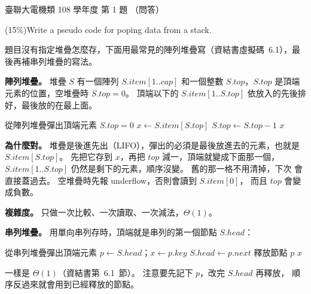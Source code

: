 \begin{pastexam}[label={px:ust-108-ee-ds-01}]{臺聯大電機類 108 學年度 第 1 題}
（問答）

(15\%)Write a pseudo code for poping data from a stack.
\end{pastexam}

\begin{pastsoln}
題目沒有指定堆疊怎麼存，下面用最常見的陣列堆疊寫（資結書虛擬碼~6.1），最後再補串列堆疊的寫法。

\textbf{陣列堆疊。} 堆疊 $S$ 有一個陣列 $S.\mathit{item}[1..\mathit{cap}]$ 和一個整數
$S.\mathit{top}$，$S.\mathit{top}$ 是頂端元素的位置，空堆疊時 $S.\mathit{top} = 0$。 頂端以下的
$S.\mathit{item}[1..S.\mathit{top}]$ 依放入的先後排好，最後放的在最上面。

\begin{pseudo}[unbreakable]{從陣列堆疊彈出頂端元素}
    \State \Return $S.\mathit{top} = 0$
\EndFunction
\Statex
{}
        \State {} 
    \EndIf
    \State $x \gets S.\mathit{item}[S.\mathit{top}]$
    \State $S.\mathit{top} \gets S.\mathit{top} - 1$
    \State \Return $x$
\EndFunction
\end{pseudo}

\textbf{為什麼對。} 堆疊是後進先出（LIFO），彈出的必須是最後放進去的元素，也就是
$S.\mathit{item}[S.\mathit{top}]$。 先把它存到 $x$，再把 $\mathit{top}$ 減一，頂端就變成下面那一個，
$S.\mathit{item}[1..S.\mathit{top}]$ 仍然是剩下的元素，順序沒變。 舊的那一格不用清掉，下次
 會直接蓋過去。 空堆疊時先報 underflow，否則會讀到 $S.\mathit{item}[0]$，
而且 $\mathit{top}$ 會變成負數。

\textbf{複雜度。} 只做一次比較、一次讀取、一次減法，$\Theta(1)$。

\textbf{串列堆疊。} 用單向串列存時，頂端就是串列的第一個節點 $S.\mathit{head}$：
\begin{pseudo}[unbreakable]{從串列堆疊彈出頂端元素}
        \State {}
    \EndIf
    \State $p \gets S.\mathit{head}$；$x \gets p.\mathit{key}$
    \State $S.\mathit{head} \gets p.\mathit{next}$
    \State 釋放節點 $p$
    \State \Return $x$
\EndFunction
\end{pseudo}
一樣是 $\Theta(1)$（資結書第~6.1~節）。 注意要先記下 $p$，改完 $S.\mathit{head}$ 再釋放，
順序反過來就會用到已經釋放的節點。
\end{pastsoln}
